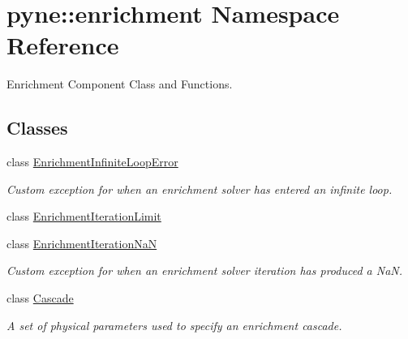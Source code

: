 \hypertarget{namespacepyne_1_1enrichment}{\section{pyne\-:\-:enrichment Namespace Reference}
\label{namespacepyne_1_1enrichment}
}


Enrichment Component Class and Functions.  


\subsection*{Classes}
\begin{DoxyCompactItemize}
\item 
class \hyperlink{classpyne_1_1enrichment_1_1_enrichment_infinite_loop_error}{Enrichment\-Infinite\-Loop\-Error}
\begin{DoxyCompactList}\small\item\em Custom exception for when an enrichment solver has entered an infinite loop. \end{DoxyCompactList}\item 
class \hyperlink{classpyne_1_1enrichment_1_1_enrichment_iteration_limit}{Enrichment\-Iteration\-Limit}
\item 
class \hyperlink{classpyne_1_1enrichment_1_1_enrichment_iteration_na_n}{Enrichment\-Iteration\-Na\-N}
\begin{DoxyCompactList}\small\item\em Custom exception for when an enrichment solver iteration has produced a Na\-N. \end{DoxyCompactList}\item 
class \hyperlink{classpyne_1_1enrichment_1_1_cascade}{Cascade}
\begin{DoxyCompactList}\small\item\em A set of physical parameters used to specify an enrichment cascade. \end{DoxyCompactList}\end{DoxyCompactItemize}
